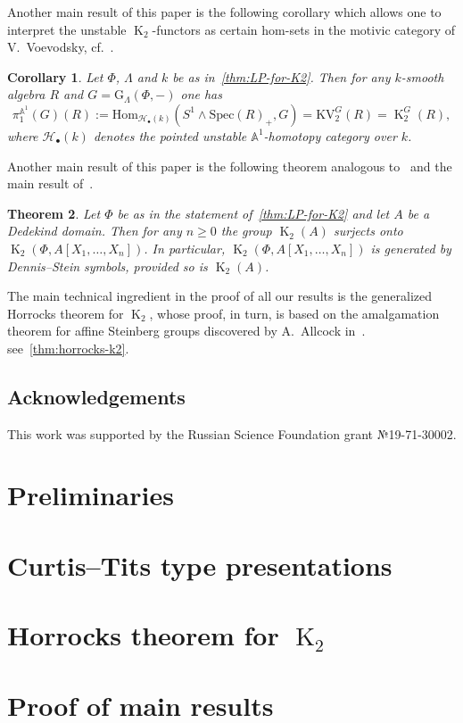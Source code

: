 \documentclass[oneside, 10pt]{amsart}
\DeclareMathOperator{\K}{K}
\newtheorem{thm}{Theorem}
\numberwithin{equation}{section}
\numberwithin{thm}{section}
\numberwithin{lemma}{section}
\newtheorem{cor}[thm]{Corollary}
\theoremstyle{definition}
\theoremstyle{remark}
\begin{document}
Another main result of this paper is the following corollary which allows one to
 interpret the unstable $\K_2$-functors as certain hom-sets in the motivic category of V.~Voevodsky,
 cf.~\cite[Corollary~1.2]{LSV2}.
\begin{cor} \label{cor:motivic-pi1} Let $\Phi$, $\Lambda$ and $k$ be as in~\cref{thm:LP-for-K2}.
Then for any $k$-smooth algebra $R$ and $G = \mathrm{G}_{\Lambda}(\Phi, -)$ one has
\[ \pi_1^{\mathbb{A}^1}(G)(R) := \mathrm{Hom}_{\mathscr{H}_{\bullet}(k)}(S^1 \wedge \mathrm{Spec}(R)_+, G) = \mathrm{KV}_2^{G}(R) = \K_2^G(R),\]
where $\mathscr{H}_\bullet(k)$ denotes the pointed unstable $\mathbb{A}^1$-homotopy category over $k$.
\end{cor}

Another main result of this paper is the following theorem analogous to~\cite[Theorem~1.1]{St-Ded}
 and the main result of~\cite{Tu83}.
\begin{thm} \label{cor:dedekind}
Let $\Phi$ be as in the statement of~\cref{thm:LP-for-K2} and let $A$ be a Dedekind domain.
Then for any $n \geq 0$ the group $\K_2(A)$ surjects onto $\K_2(\Phi, A[X_1,\ldots, X_n])$.
In particular, $\K_2(\Phi, A[X_1,\ldots, X_n])$ is generated by Dennis--Stein symbols,
 provided so is $\K_2(A)$.
\end{thm}

The main technical ingredient in the proof of all our results is the generalized Horrocks theorem for $\K_2$,
 whose proof, in turn, is based on the amalgamation theorem for affine Steinberg groups discovered by A.~Allcock in~\cite{A13}.
 see~\cref{thm:horrocks-k2}.

\subsection{Acknowledgements}
This work was supported by the Russian Science Foundation grant №19-71-30002.

    \section{Preliminaries}\label{sec:preliminaries}
    

    \section{Curtis--Tits type presentations} \label{sec:affine}
    

    \section{Horrocks theorem for $\K_2$} \label{sec:horrocks}
    

    \section{Proof of main results} \label{sec:main}
    

    \printbibliography
\end{document}
